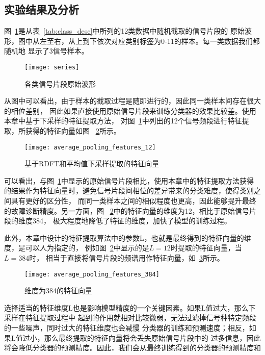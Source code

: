 \subsection{实验结果及分析}
\label{subsection:cascade_result}

图~\ref{fig:series}是从表~\ref{tab:class_desc}中所列的12类数据中随机截取的信号片段的
原始波形，图中从左至右，从上到下依次对应类别标签为0-11的样本。每一类数据我们都随机地
显示了3信号样本。
\begin{figure}[ht] %
  \centering
  \texttt{[image: series]}
  \caption{各类信号片段原始波形}
  \label{fig:series}
\end{figure}

从图中可以看出，由于样本的截取过程是随即进行的，因此同一类样本间存在很大的相位差别，
因此如果直接使用原始信号片段来训练分类器的效果比较差。使用本章中基于下采样的特征提取方法，
对图~\ref{fig:series}中列出的12个信号频段进行特征提取，所获得的特征向量如图
~\ref{fig:average_pooling_features_12}所示。
\begin{figure}[ht] %
  \centering
  \texttt{[image: average\_pooling\_features\_12]}
  \caption{基于RDFT和平均值下采样提取的特征向量}
  \label{fig:average_pooling_features_12}
\end{figure}

可以看出，与图~\ref{fig:series}中显示的原始信号片段相比，使用本章中的特征提取方法获得
的结果作为特征向量时，避免信号片段间相位的差异带来的分类难度，使得类别之间具有更好的区分性，
而同一类样本之间的相似程度也更高，因此能够提升最终的故障诊断精度。另一方面，图
~\ref{fig:average_pooling_features_12}中的特征向量的维度为12，相比于原始信号片段的维度384，
极大程度地降低了特征的维度，加快了模型的训练过程。

此外，本章中设计的特征提取算法中的参数L，也就是最终得到的特征向量的维度，是可以人为指定的，
例如图~\ref{fig:average_pooling_features_12}中显示的是$L=12$时提取的特征向量，当$L=384$时，
相当于直接将信号片段的频谱用作特征向量，如~\ref{fig:average_pooling_features_384}所示。
\begin{figure}[ht] %
  \centering
  \texttt{[image: average\_pooling\_features\_384]}
  \caption{维度为384的特征向量}
  \label{fig:average_pooling_features_384}
\end{figure}

选择适当的特征维度L也是影响模型精度的一个关键因素。如果L值过大，那么下采样在特征提取过程中
起到的作用就相对比较微弱，无法过滤掉信号种特定频段的一些噪声，同时过大的特征维度也会减慢
分类器的训练和预测速度；相反，如果L值过小，那么最终提取的特征向量将会丢失原始信号片段中的
过多信息，因此将会降低分类器的预测精度。因此，我们会从最终训练得到的分类器的预测精度和训练
过程所用时长两方面考虑，来最终选择合适的L值。

